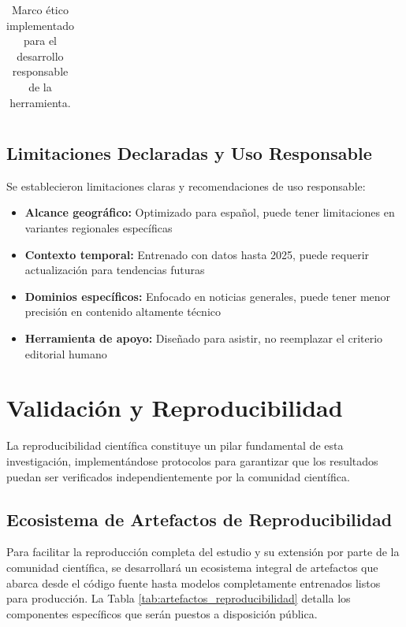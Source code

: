\begin{table}[htbp]
{\begin{tabular}{|l|l|l|l|}
\hline
\end{tabular}
}
\caption{Marco ético implementado para el desarrollo responsable de la herramienta.}
\label{tab:marco_etico}
\end{table}


\subsection{Limitaciones Declaradas y Uso Responsable}

Se establecieron limitaciones claras y recomendaciones de uso responsable:

\begin{itemize}
    \item \textbf{Alcance geográfico:} Optimizado para español, puede tener limitaciones en variantes regionales específicas
    \item \textbf{Contexto temporal:} Entrenado con datos hasta 2025, puede requerir actualización para tendencias futuras
    \item \textbf{Dominios específicos:} Enfocado en noticias generales, puede tener menor precisión en contenido altamente técnico
    \item \textbf{Herramienta de apoyo:} Diseñado para asistir, no reemplazar el criterio editorial humano
\end{itemize}

\section{Validación y Reproducibilidad}
\label{sec:validacion_reproducibilidad}

La reproducibilidad científica constituye un pilar fundamental de esta investigación, implementándose protocolos para garantizar que los resultados puedan ser verificados independientemente por la comunidad científica. 

\subsection{Ecosistema de Artefactos de Reproducibilidad}

Para facilitar la reproducción completa del estudio y su extensión por parte de la comunidad científica, se desarrollará un ecosistema integral de artefactos que abarca desde el código fuente hasta modelos completamente entrenados listos para producción. La Tabla \ref{tab:artefactos_reproducibilidad} detalla los componentes específicos que serán puestos a disposición pública.

